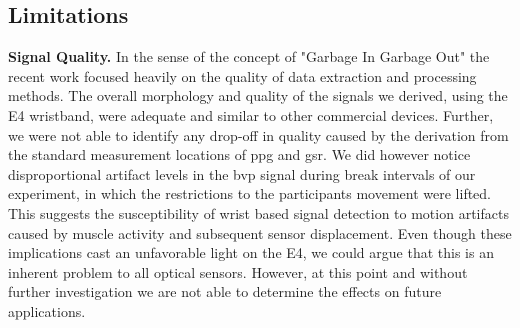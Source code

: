\subsection{Limitations}\label{lim}
\textbf{Signal Quality.}
In the sense of the concept of "Garbage In Garbage Out" the recent work focused heavily on the quality of data extraction and processing methods. The overall morphology and quality of the signals we derived, using the E4 wristband, were adequate and similar to other commercial devices. Further, we were not able to identify any drop-off in quality caused by the derivation from the standard measurement locations of \gls{ppg} and \gls{gsr}. We did however notice disproportional artifact levels in the \gls{bvp} signal during break intervals of our experiment, in which the restrictions to the participants movement were lifted. This suggests the susceptibility of wrist based signal detection to motion artifacts caused by muscle activity and subsequent sensor displacement. Even though these implications cast an unfavorable light on the E4, we could argue that this is an inherent problem to all optical sensors. However, at this point and without further investigation we are not able to determine the effects on future applications.\\[10pt]
